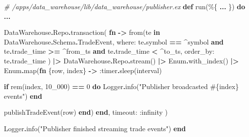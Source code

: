 \documentclass[
  oneside]{book}
\newenvironment{Shaded}{\begin{snugshade}}{\end{snugshade}}
\newcommand{\CommentTok}[1]{\textcolor[rgb]{0.56,0.35,0.01}{\textit{#1}}}
\newcommand{\ConstantTok}[1]{\textcolor[rgb]{0.00,0.00,0.00}{#1}}
\newcommand{\ControlFlowTok}[1]{\textcolor[rgb]{0.13,0.29,0.53}{\textbf{#1}}}
\newcommand{\DecValTok}[1]{\textcolor[rgb]{0.00,0.00,0.81}{#1}}
\newcommand{\KeywordTok}[1]{\textcolor[rgb]{0.13,0.29,0.53}{\textbf{#1}}}
\newcommand{\NormalTok}[1]{#1}
\newcommand{\OperatorTok}[1]{\textcolor[rgb]{0.81,0.36,0.00}{\textbf{#1}}}
\newcommand{\OtherTok}[1]{\textcolor[rgb]{0.56,0.35,0.01}{#1}}
\newcommand{\StringTok}[1]{\textcolor[rgb]{0.31,0.60,0.02}{#1}}
\newcommand{\VariableTok}[1]{\textcolor[rgb]{0.00,0.00,0.00}{#1}}
\begin{document}
\begin{Shaded}
\begin{Highlighting}[]
  \CommentTok{\# /apps/data\_warehouse/lib/data\_warehouse/publisher.ex}
  \KeywordTok{def}\NormalTok{ run(\%\{}
        \OperatorTok{...}
\NormalTok{      \}) }\KeywordTok{do}
    \OperatorTok{...}

    \ConstantTok{DataWarehouse}\OperatorTok{.}\ConstantTok{Repo}\OperatorTok{.}\NormalTok{transaction(}
      \KeywordTok{fn} \OperatorTok{{-}\textgreater{}}
\NormalTok{        from(te }\KeywordTok{in} \ConstantTok{DataWarehouse}\OperatorTok{.}\ConstantTok{Schema}\OperatorTok{.}\ConstantTok{TradeEvent}\NormalTok{,}
          \VariableTok{where:}
\NormalTok{            te}\OperatorTok{.}\NormalTok{symbol }\OperatorTok{==} \OperatorTok{\^{}}\NormalTok{symbol }\KeywordTok{and}
\NormalTok{              te}\OperatorTok{.}\NormalTok{trade\_time }\OperatorTok{\textgreater{}=} \OperatorTok{\^{}}\NormalTok{from\_ts }\KeywordTok{and}
\NormalTok{              te}\OperatorTok{.}\NormalTok{trade\_time }\OperatorTok{\textless{}} \OperatorTok{\^{}}\NormalTok{to\_ts,}
          \VariableTok{order\_by:}\NormalTok{ te}\OperatorTok{.}\NormalTok{trade\_time}
\NormalTok{        )}
        \OperatorTok{|\textgreater{}} \ConstantTok{DataWarehouse}\OperatorTok{.}\ConstantTok{Repo}\OperatorTok{.}\NormalTok{stream()}
        \OperatorTok{|\textgreater{}} \ConstantTok{Enum}\OperatorTok{.}\NormalTok{with\_index()}
        \OperatorTok{|\textgreater{}} \ConstantTok{Enum}\OperatorTok{.}\NormalTok{map(}\KeywordTok{fn}\NormalTok{ \{row, index\} }\OperatorTok{{-}\textgreater{}}
          \VariableTok{:timer}\OperatorTok{.}\NormalTok{sleep(interval)}

          \ControlFlowTok{if}\NormalTok{ rem(index, }\DecValTok{10\_000}\NormalTok{) }\OperatorTok{==} \DecValTok{0} \KeywordTok{do}
            \ConstantTok{Logger}\OperatorTok{.}\NormalTok{info(}\StringTok{"Publisher broadcasted }\OtherTok{\#\{}\NormalTok{index}\OtherTok{\}}\StringTok{ events"}\NormalTok{)}
          \KeywordTok{end}

\NormalTok{          publishTradeEvent(row)}
        \KeywordTok{end}\NormalTok{)}
      \KeywordTok{end}\NormalTok{,}
      \VariableTok{timeout:} \VariableTok{:infinity}
\NormalTok{    )}

    \ConstantTok{Logger}\OperatorTok{.}\NormalTok{info(}\StringTok{"Publisher finished streaming trade events"}\NormalTok{)}
  \KeywordTok{end}
\end{Highlighting}
\end{Shaded}
\end{document}
